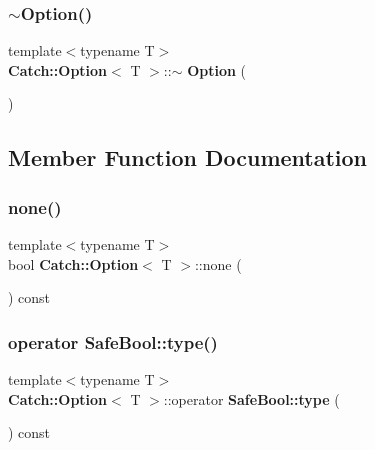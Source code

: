 \subsubsection{$\sim$\+Option()}
{\footnotesize\ttfamily template$<$typename T$>$ \\
\textbf{ Catch\+::\+Option}$<$ T $>$\+::$\sim$\textbf{ Option} (\begin{DoxyParamCaption}{ }\end{DoxyParamCaption})\hspace{0.3cm}{\ttfamily [inline]}}



\subsection{Member Function Documentation}
\mbox{\label{class_catch_1_1_option_a821753afdc3fac947a13a01fbe0d248e}} 
\subsubsection{none()}
{\footnotesize\ttfamily template$<$typename T$>$ \\
bool \textbf{ Catch\+::\+Option}$<$ T $>$\+::none (\begin{DoxyParamCaption}{ }\end{DoxyParamCaption}) const\hspace{0.3cm}{\ttfamily [inline]}}

\mbox{\label{class_catch_1_1_option_a8ed8de7b072f893c85df14913dbbe197}} 
\subsubsection{operator Safe\+Bool\+::type()}
{\footnotesize\ttfamily template$<$typename T$>$ \\
\textbf{ Catch\+::\+Option}$<$ T $>$\+::operator \textbf{ Safe\+Bool\+::type} (\begin{DoxyParamCaption}{ }\end{DoxyParamCaption}) const\hspace{0.3cm}{\ttfamily [inline]}}

\mbox{\label{class_catch_1_1_option_a96dccb86bdf45ee0c08e122b6133bef3}} 
